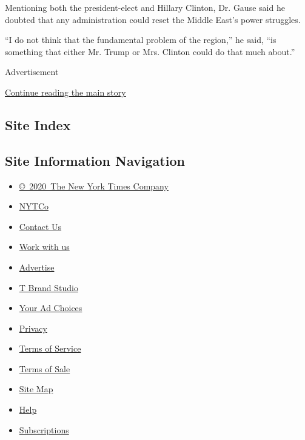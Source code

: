 Mentioning both the president-elect and Hillary Clinton, Dr. Gause said
he doubted that any administration could reset the Middle East's power
struggles.

``I do not think that the fundamental problem of the region,'' he said,
``is something that either Mr. Trump or Mrs. Clinton could do that much
about.''

Advertisement

\protect\hyperlink{after-bottom}{Continue reading the main story}

\hypertarget{site-index}{%
\subsection{Site Index}\label{site-index}}

\hypertarget{site-information-navigation}{%
\subsection{Site Information
Navigation}\label{site-information-navigation}}

\begin{itemize}
\tightlist
\item
  \href{https://help.nytimes.com/hc/en-us/articles/115014792127-Copyright-notice}{©~2020~The
  New York Times Company}
\end{itemize}

\begin{itemize}
\tightlist
\item
  \href{https://www.nytco.com/}{NYTCo}
\item
  \href{https://help.nytimes.com/hc/en-us/articles/115015385887-Contact-Us}{Contact
  Us}
\item
  \href{https://www.nytco.com/careers/}{Work with us}
\item
  \href{https://nytmediakit.com/}{Advertise}
\item
  \href{http://www.tbrandstudio.com/}{T Brand Studio}
\item
  \href{https://www.nytimes.com/privacy/cookie-policy\#how-do-i-manage-trackers}{Your
  Ad Choices}
\item
  \href{https://www.nytimes.com/privacy}{Privacy}
\item
  \href{https://help.nytimes.com/hc/en-us/articles/115014893428-Terms-of-service}{Terms
  of Service}
\item
  \href{https://help.nytimes.com/hc/en-us/articles/115014893968-Terms-of-sale}{Terms
  of Sale}
\item
  \href{https://spiderbites.nytimes.com}{Site Map}
\item
  \href{https://help.nytimes.com/hc/en-us}{Help}
\item
  \href{https://www.nytimes.com/subscription?campaignId=37WXW}{Subscriptions}
\end{itemize}
